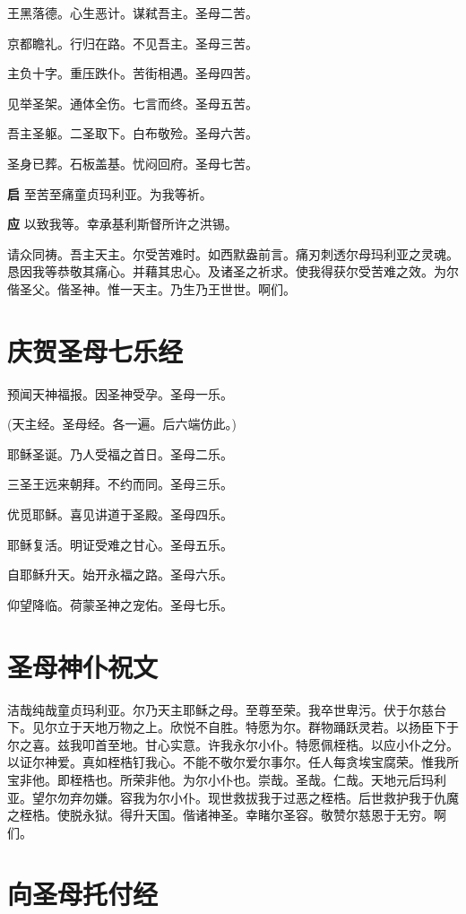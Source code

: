 \documentclass[UTF8,17pt]{ctexart}
\begin{document}
王⿊落德。⼼⽣恶计。谋弒吾主。圣母⼆苦。

京都瞻礼。⾏归在路。不见吾主。圣母三苦。

主负⼗字。重压跌仆。苦街相遇。圣母四苦。

见举圣架。通体全伤。七⾔⽽终。圣母五苦。

吾主圣躯。⼆圣取下。⽩布敬殓。圣母六苦。

圣⾝已葬。⽯板盖基。忧闷回府。圣母七苦。

\textbf{启} \quad ⾄苦⾄痛童贞玛利亚。为我等祈。

\textbf{应} \quad 以致我等。幸承基利斯督所许之洪锡。

请众同祷。吾主天主。尔受苦难时。如西默盎前⾔。痛刃刺透尔母玛利亚之灵魂。恳因我等恭敬其痛⼼。并藉其忠⼼。及诸圣之祈求。使我得获尔受苦难之效。为尔偕圣⽗。偕圣神。惟⼀天主。乃⽣乃王世世。啊们。

\section{庆贺圣母七乐经}

预闻天神福报。因圣神受孕。圣母⼀乐。

(天主经。圣母经。各⼀遍。后六端仿此。)

耶稣圣诞。乃⼈受福之⾸⽇。圣母⼆乐。

三圣王远来朝拜。不约⽽同。圣母三乐。

优觅耶稣。喜见讲道于圣殿。圣母四乐。

耶稣复活。明证受难之⽢⼼。圣母五乐。

⾃耶稣升天。始开永福之路。圣母六乐。

仰望降临。荷蒙圣神之宠佑。圣母七乐。

\section{圣母神仆祝⽂}

洁哉纯哉童贞玛利亚。尔乃天主耶稣之母。⾄尊⾄荣。我卒世卑污。伏于尔慈台下。见尔⽴于天地万物之上。欣悦不⾃胜。特愿为尔。群物踊跃灵若。以扬⾂下于尔之喜。兹我叩⾸⾄地。⽢⼼实意。许我永尔⼩仆。特愿佩桎梏。以应⼩仆之分。以证尔神爱。真如桎梏钉我⼼。不能不敬尔爱尔事尔。任⼈每贪埃宝腐荣。惟我所宝⾮他。即桎梏也。所荣⾮他。为尔⼩仆也。崇哉。圣哉。仁哉。天地元后玛利亚。望尔勿弃勿嫌。容我为尔⼩仆。现世救拔我于过恶之桎梏。后世救护我于仇魔之桎梏。使脱永狱。得升天国。偕诸神圣。幸睹尔圣容。敬赞尔慈恩于⽆穷。啊们。

\section{向圣母托付经}
\end{document}

